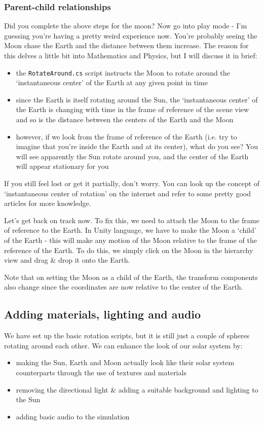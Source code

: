 \documentclass{article}[a4paper,12pt]
\theoremstyle{definition}
\begin{document}
\subsubsection{Parent-child relationships}
Did you complete the above steps for the moon? Now go into play mode - I'm guessing you're having a pretty weird experience now. You're probably seeing the Moon chase the Earth and the distance between them increase. The reason for this delves a little bit into Mathematics and Physics, but I will discuss it in brief:
\begin{itemize}
	\item the \texttt{RotateAround.cs} script instructs the Moon to rotate around the `instantaneous center' of the Earth at any given point in time
	\item since the Earth is itself rotating around the Sun, the `instantaneous center' of the Earth is changing with time in the frame of reference of the scene view and so is the distance between the centers of the Earth and the Moon
	\item however, if we look from the frame of reference of the Earth (i.e. try to imagine that you're inside the Earth and at its center), what do you see? You will see apparently the Sun rotate around you, and the center of the Earth will appear stationary for you
\end{itemize}
If you still feel lost or get it partially, don't worry. You can look up the concept of `instantaneous center of rotation' on the internet and refer to some pretty good articles for more knowledge. 
\vspace{6pt}

Let's get back on track now. To fix this, we need to attach the Moon to the frame of reference to the Earth. In Unity language, we have to make the Moon a `child' of the Earth - this will make any motion of the Moon relative to the frame of the reference of the Earth. To do this, we simply click on the Moon in the hierarchy view and drag \& drop it onto the Earth.
\vspace{6pt}

Note that on setting the Moon as a child of the Earth, the transform components also change since the coordinates are now relative to the center of the Earth.
\subsection{Adding materials, lighting and audio}
We have set up the basic rotation scripts, but it is still just a couple of spheres rotating around each other. We can enhance the look of our solar system by:
\begin{itemize}
	\item making the Sun, Earth and Moon actually look like their solar system counterparts through the use of textures and materials
	\item removing the directional light \& adding a suitable background and lighting to the Sun
	\item adding basic audio to the simulation
\end{itemize}
\end{document}
